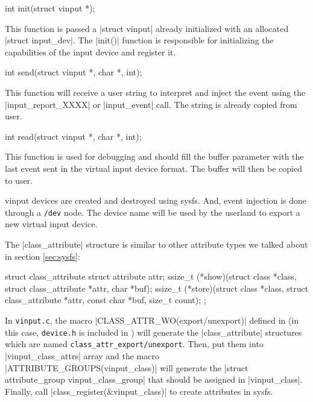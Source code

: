 \documentclass[10pt, oneside]{book}
\begin{document}
\begin{code}
int init(struct vinput *);
\end{code}

This function is passed a \cpp|struct vinput| already initialized with an allocated \cpp|struct input_dev|.
The \cpp|init()| function is responsible for initializing the capabilities of the input device and register it.

\begin{code}
int send(struct vinput *, char *, int);
\end{code}

This function will receive a user string to interpret and inject the event using the \cpp|input_report_XXXX| or \cpp|input_event| call.
The string is already copied from user.

\begin{code}
int read(struct vinput *, char *, int);
\end{code}

This function is used for debugging and should fill the buffer parameter with the last event sent in the virtual input device format.
The buffer will then be copied to user.

vinput devices are created and destroyed using sysfs.
And, event injection is done through a \verb|/dev| node.
The device name will be used by the userland to export a new virtual input device.

The \cpp|class_attribute| structure is similar to other attribute types we talked about in section \ref{sec:sysfs}:

\begin{code}
struct class_attribute {
    struct attribute attr;
    ssize_t (*show)(struct class *class, struct class_attribute *attr,
                    char *buf);
    ssize_t (*store)(struct class *class, struct class_attribute *attr,
                    const char *buf, size_t count);
};
\end{code}

In \verb|vinput.c|, the macro \cpp|CLASS_ATTR_WO(export/unexport)| defined in  (in this case, \verb|device.h| is included in ) will generate the \cpp|class_attribute| structures which are named \verb|class_attr_export/unexport|.
Then, put them into \cpp|vinput_class_attrs| array and the macro \cpp|ATTRIBUTE_GROUPS(vinput_class)| will generate the \cpp|struct attribute_group vinput_class_group| that should be assigned in \cpp|vinput_class|.
Finally, call \cpp|class_register(&vinput_class)| to create attributes in sysfs.
\end{document}
